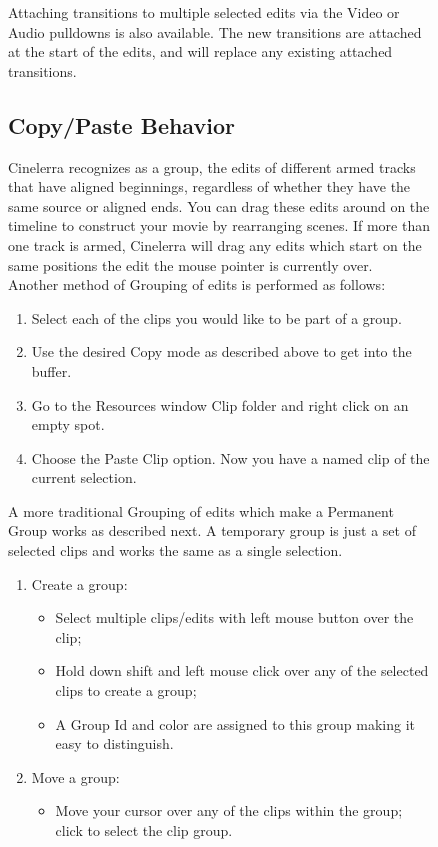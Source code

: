 \begin{figure}
Attaching transitions to multiple selected edits via the Video or Audio pulldowns is also available.  The new transitions are attached at the start of the edits, and will replace any existing attached transitions.

\subsection{Copy/Paste Behavior}%
\label{sub:copy_paste_behavior}

Cinelerra recognizes as a group, the edits of different armed tracks that have aligned beginnings, regardless of whether they have the same source or aligned ends.  You can drag these edits around on the timeline to construct your movie by rearranging scenes. If more than one track is armed, Cinelerra will drag any edits which start on the same positions the edit the mouse pointer is currently over. \\
Another method of Grouping of edits is performed as follows:
\begin{enumerate}
    \item Select each of the clips you would like to be part of a group.
    \item Use the desired Copy mode as described above to get into the buffer.
    \item Go to the Resources window Clip folder and right click on an empty spot.
    \item Choose the Paste Clip option.  Now you have a named clip of the current selection.
\end{enumerate}
A more traditional Grouping of edits which make a Permanent Group works as described next.  A temporary group is just a set of selected clips and works the same as a single selection.
\begin{enumerate}
    \item Create a group:
    \begin{itemize}[noitemsep]
        \item Select multiple clips/edits with left mouse button over the clip;
        \item Hold down shift and left mouse click over any of the selected clips to create a group;
        \item A Group Id and color are assigned to this group making it easy to distinguish.
    \end{itemize}
    \item Move a group:
    \begin{itemize}[noitemsep]
        \item Move your cursor over any of the clips within the group;  click to select the clip group.

\end{itemize}
\end{enumerate}
\end{figure}
